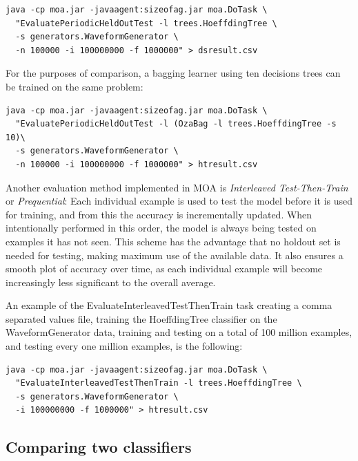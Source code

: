 \documentclass[a4paper,12pt,twoside]{book}
\begin{document}
\begin{footnotesize}\begin{verbatim}
java -cp moa.jar -javaagent:sizeofag.jar moa.DoTask \
  "EvaluatePeriodicHeldOutTest -l trees.HoeffdingTree \
  -s generators.WaveformGenerator \
  -n 100000 -i 100000000 -f 1000000" > dsresult.csv
\end{verbatim}\end{footnotesize}

  For the purposes of comparison, a bagging learner using ten decisions trees can be trained on
the same problem:
\begin{footnotesize}\begin{verbatim}
java -cp moa.jar -javaagent:sizeofag.jar moa.DoTask \
  "EvaluatePeriodicHeldOutTest -l (OzaBag -l trees.HoeffdingTree -s 10)\
  -s generators.WaveformGenerator \
  -n 100000 -i 100000000 -f 1000000" > htresult.csv
\end{verbatim}\end{footnotesize}


Another evaluation method implemented in MOA is \emph{Interleaved Test-Then-Train}  or \emph{Prequential}:
 Each individual example is used to test the model
before it is used for training, and from this the accuracy is incrementally
updated. When intentionally performed in this order, the model is always
being tested on examples it has not seen. This scheme has the advantage that
no holdout set is needed for testing, making maximum use of the available
data. It also ensures a smooth plot of accuracy over time, as each individual
example will become increasingly less significant to the overall average.

An example of the EvaluateInterleavedTestThenTrain task  
creating a comma separated values file, training the
HoeffdingTree classifier on the WaveformGenerator data, training and testing on a total of 100 million
examples, and testing every one million examples, is the following:

\begin{footnotesize}\begin{verbatim}
java -cp moa.jar -javaagent:sizeofag.jar moa.DoTask \
  "EvaluateInterleavedTestThenTrain -l trees.HoeffdingTree \
  -s generators.WaveformGenerator \
  -i 100000000 -f 1000000" > htresult.csv
\end{verbatim}
\end{footnotesize}

\subsection{Comparing two classifiers}
\end{document}
